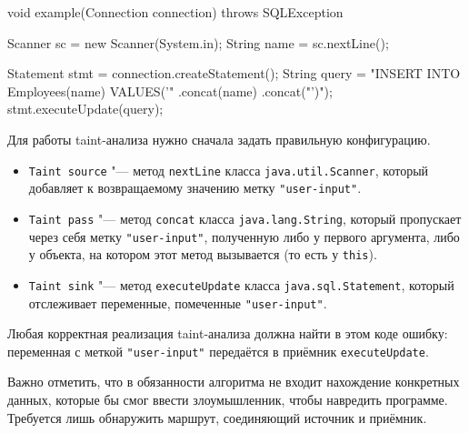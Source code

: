 \begin{code}
void example(Connection connection) throws SQLException {
    Scanner sc = new Scanner(System.in);
    String name = sc.nextLine();

    Statement stmt = connection.createStatement();
    String query = 
        "INSERT INTO Employees(name) VALUES('"
        .concat(name)
        .concat("')");
    stmt.executeUpdate(query);
}
\end{code}

Для работы taint-анализа нужно сначала задать правильную конфигурацию.
\begin{itemize}
    \item \verb|Taint source| "--- метод \verb|nextLine| класса \verb|java.util.Scanner|, который добавляет к возвращаемому значению метку \verb|"user-input"|.
    \item \verb|Taint pass| "--- метод \verb|concat| класса \verb|java.lang.String|, который пропускает через себя метку \verb|"user-input"|, полученную либо у первого аргумента, либо у объекта, на котором этот метод вызывается (то есть у \verb|this|).
    \item \verb|Taint sink| "--- метод \verb|executeUpdate| класса \verb|java.sql.Statement|, который отслеживает переменные, помеченные \verb|"user-input"|.
\end{itemize}

Любая корректная реализация taint-анализа должна найти в этом коде ошибку: переменная  с меткой \verb|"user-input"| передаётся в приёмник \verb|executeUpdate|. 

Важно отметить, что в обязанности алгоритма не входит нахождение конкретных данных, которые бы смог ввести злоумышленник, чтобы навредить программе. Требуется лишь обнаружить маршрут, соединяющий источник и приёмник.
